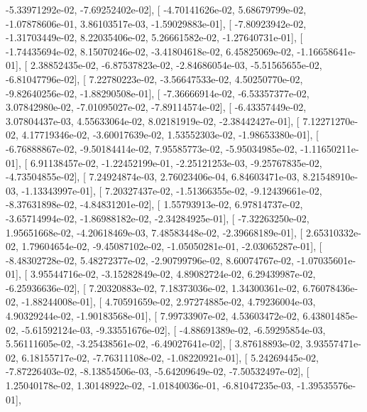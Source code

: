 \documentclass{article}
\begin{document}
         -5.33971292e-02,  -7.69252402e-02],
       [ -4.70141626e-02,   5.68679799e-02,  -1.07878606e-01,
          3.86103517e-03,  -1.59029883e-01],
       [ -7.80923942e-02,  -1.31703449e-02,   8.22035406e-02,
          5.26661582e-02,  -1.27640731e-01],
       [ -1.74435694e-02,   8.15070246e-02,  -3.41804618e-02,
          6.45825069e-02,  -1.16658641e-01],
       [  2.38852435e-02,  -6.87537823e-02,  -2.84686054e-03,
         -5.51565655e-02,  -6.81047796e-02],
       [  7.22780223e-02,  -3.56647533e-02,   4.50250770e-02,
         -9.82640256e-02,  -1.88290508e-01],
       [ -7.36666914e-02,  -6.53357377e-02,   3.07842980e-02,
         -7.01095027e-02,  -7.89114574e-02],
       [ -6.43357449e-02,   3.07804437e-03,   4.55633064e-02,
          8.02181919e-02,  -2.38442427e-01],
       [  7.12271270e-02,   4.17719346e-02,  -3.60017639e-02,
          1.53552303e-02,  -1.98653380e-01],
       [ -6.76888867e-02,  -9.50184414e-02,   7.95585773e-02,
         -5.95034985e-02,  -1.11650211e-01],
       [  6.91138457e-02,  -1.22452199e-01,  -2.25121253e-03,
         -9.25767835e-02,  -4.73504855e-02],
       [  7.24924874e-03,   2.76023406e-04,   6.84603471e-03,
          8.21548910e-03,  -1.13343997e-01],
       [  7.20327437e-02,  -1.51366355e-02,  -9.12439661e-02,
         -8.37631898e-02,  -4.84831201e-02],
       [  1.55793913e-02,   6.97814737e-02,  -3.65714994e-02,
         -1.86988182e-02,  -2.34284925e-01],
       [ -7.32263250e-02,   1.95651668e-02,  -4.20618469e-03,
          7.48583448e-02,  -2.39668189e-01],
       [  2.65310332e-02,   1.79604654e-02,  -9.45087102e-02,
         -1.05050281e-01,  -2.03065287e-01],
       [ -8.48302728e-02,   5.48272377e-02,  -2.90799796e-02,
          8.60074767e-02,  -1.07035601e-01],
       [  3.95544716e-02,  -3.15282849e-02,   4.89082724e-02,
          6.29439987e-02,  -6.25936636e-02],
       [  7.20320883e-02,   7.18373036e-02,   1.34300361e-02,
          6.76078436e-02,  -1.88244008e-01],
       [  4.70591659e-02,   2.97274885e-02,   4.79236004e-03,
          4.90329244e-02,  -1.90183568e-01],
       [  7.99733907e-02,   4.53603472e-02,   6.43801485e-02,
         -5.61592124e-03,  -9.33551676e-02],
       [ -4.88691389e-02,  -6.59295854e-03,   5.56111605e-02,
         -3.25438561e-02,  -6.49027641e-02],
       [  3.87618893e-02,   3.93557471e-02,   6.18155717e-02,
         -7.76311108e-02,  -1.08220921e-01],
       [  5.24269445e-02,  -7.87226403e-02,  -8.13854506e-03,
         -5.64209649e-02,  -7.50532497e-02],
       [  1.25040178e-02,   1.30148922e-02,  -1.01840036e-01,
         -6.81047235e-03,  -1.39535576e-01],
\end{document}
